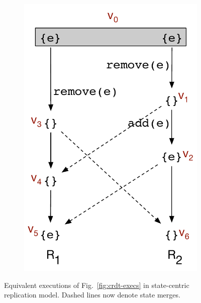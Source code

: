 \begin{figure}[ht]
\begin{subfigure}[t]{0.44\columnwidth}
    \includegraphics[scale=0.35]{Figures/mrdt-execs-2}
    \caption{}
    \label{fig:mrdt-execs-2}
  \end{subfigure}
\caption{Equivalent executions of Fig.~\ref{fig:crdt-execs} in
state-centric replication model. Dashed lines now denote state merges.}
\label{fig:mrdt-execs}
\end{figure}

